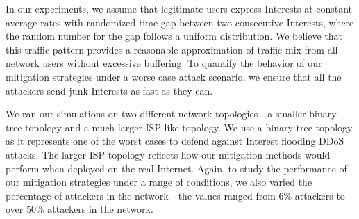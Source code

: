 
In our experiments, we assume that legitimate users express Interests at constant average rates with randomized time gap between two consecutive Interests, where the random number for the gap follows a uniform distribution. We believe that this traffic pattern provides a reasonable approximation of traffic mix from all network users without excessive buffering. To quantify the behavior of our mitigation strategies under a worse case attack scenario, we ensure that all the attackers send junk Interests as fast as they can. 



We ran our simulations on two different network topologies---a smaller binary tree topology and a much larger ISP-like topology. We use a binary tree topology as it represents one of the worst cases to defend against Interest flooding DDoS attacks. The larger ISP topology reflects how our mitigation methods would perform when deployed on the real Internet.
Again, to study the performance of our mitigation strategies under a range of conditions, we also varied the percentage of attackers in the network---the values ranged from 6\% attackers to over 50\% attackers in the network.

